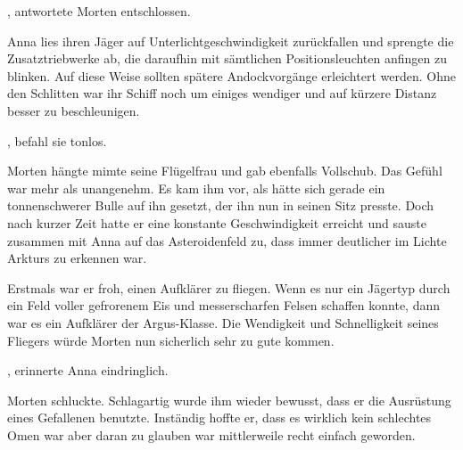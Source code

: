\par

, antwortete Morten entschlossen.

\par

 Anna lies ihren Jäger auf Unterlichtgeschwindigkeit zurückfallen und sprengte die Zusatztriebwerke ab, die daraufhin mit sämtlichen Positionsleuchten anfingen zu blinken. Auf diese Weise sollten spätere Andockvorgänge erleichtert werden. Ohne den Schlitten war ihr Schiff noch um einiges wendiger und auf kürzere Distanz besser zu beschleunigen.

\par

, befahl sie tonlos.

\par

Morten hängte mimte seine Flügelfrau und gab ebenfalls Vollschub. Das Gefühl war mehr als unangenehm. Es kam ihm vor, als hätte sich gerade ein tonnenschwerer Bulle auf ihn gesetzt, der ihn nun in seinen Sitz presste. Doch nach kurzer Zeit hatte er eine konstante Geschwindigkeit erreicht und sauste zusammen mit Anna auf das Asteroidenfeld zu, dass immer deutlicher im Lichte Arkturs zu erkennen war.

\par

Erstmals war er froh, einen Aufklärer zu fliegen. Wenn es nur ein Jägertyp durch ein Feld voller gefrorenem Eis und messerscharfen Felsen schaffen konnte, dann war es ein Aufklärer der Argus-Klasse. Die Wendigkeit und Schnelligkeit seines Fliegers würde Morten nun sicherlich sehr zu gute kommen.

\par

, erinnerte Anna eindringlich. 

\par

Morten schluckte. Schlagartig wurde ihm wieder bewusst, dass er die Ausrüstung eines Gefallenen benutzte. Inständig hoffte er, dass es wirklich kein schlechtes Omen war aber daran zu glauben war mittlerweile recht einfach geworden.

